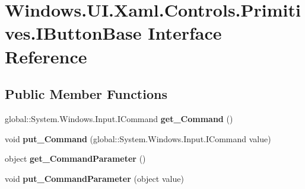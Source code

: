\hypertarget{interface_windows_1_1_u_i_1_1_xaml_1_1_controls_1_1_primitives_1_1_i_button_base}{}\section{Windows.\+U\+I.\+Xaml.\+Controls.\+Primitives.\+I\+Button\+Base Interface Reference}
\label{interface_windows_1_1_u_i_1_1_xaml_1_1_controls_1_1_primitives_1_1_i_button_base}
\subsection*{Public Member Functions}
\begin{DoxyCompactItemize}
\item 
\mbox{\label{interface_windows_1_1_u_i_1_1_xaml_1_1_controls_1_1_primitives_1_1_i_button_base_a32d7306ce7ae819ba8afcf8654502772}} 
global\+::\+System.\+Windows.\+Input.\+I\+Command {\bfseries get\+\_\+\+Command} ()
\item 
\mbox{\label{interface_windows_1_1_u_i_1_1_xaml_1_1_controls_1_1_primitives_1_1_i_button_base_a9a50f3b26afbef855e934ed8c1aa1c7a}} 
void {\bfseries put\+\_\+\+Command} (global\+::\+System.\+Windows.\+Input.\+I\+Command value)
\item 
\mbox{\label{interface_windows_1_1_u_i_1_1_xaml_1_1_controls_1_1_primitives_1_1_i_button_base_a844671cebaf433eca7be5733492d0c32}} 
object {\bfseries get\+\_\+\+Command\+Parameter} ()
\item 
\mbox{\label{interface_windows_1_1_u_i_1_1_xaml_1_1_controls_1_1_primitives_1_1_i_button_base_ae70dfa727c7375ca02faf4ed550e7941}} 
void {\bfseries put\+\_\+\+Command\+Parameter} (object value)
\item 
\mbox{\label{interface_windows_1_1_u_i_1_1_xaml_1_1_controls_1_1_primitives_1_1_i_button_base_a810a2e8203417bd2fe1eb15adc0d85b5}} 

\end{DoxyCompactItemize}
